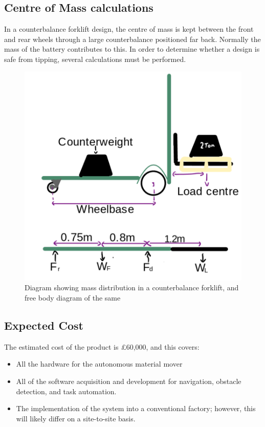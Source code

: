 \documentclass[12pt]{article}
\begin{document}
\subsection{Centre of Mass calculations}
In a counterbalance forklift design, the centre of mass is kept between the front and rear wheels through a large counterbalance positioned far back. Normally the mass of the battery contributes to this. In order to determine whether a design  is  safe from tipping, several calculations must be performed.
\begin{figure} [H]
    \centering
    \includegraphics[width=0.5\linewidth]{Tipping Calculations.png}
    \caption{Diagram showing mass distribution in a counterbalance forklift, and free body diagram of the same}
    
\end{figure}
\subsection{Expected Cost}

{The estimated cost of the product \cite{P. Hinz} is £60,000, and this covers:}
\begin{itemize}
    \item All the hardware for the autonomous material mover 
    \item All of the software acquisition and development for navigation, obstacle detection, and task automation.
    \item The implementation of the system into a conventional factory; however, this will likely differ on a site-to-site basis.
\end{itemize}
\end{document}
